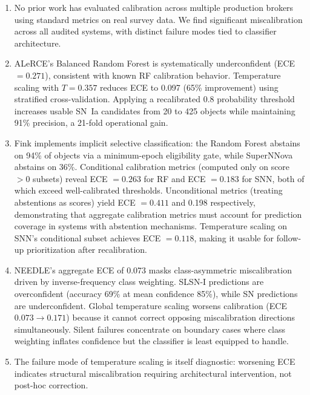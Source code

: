\documentclass[twocolumn]{aastex631}
\begin{document}
\begin{enumerate}
    \item No prior work has evaluated calibration across multiple production brokers using standard metrics on real survey data. We find significant miscalibration across all audited systems, with distinct failure modes tied to classifier architecture.

    \item ALeRCE's Balanced Random Forest is systematically underconfident (ECE $= 0.271$), consistent with known RF calibration behavior. Temperature scaling with $T = 0.357$ reduces ECE to 0.097 (65\% improvement) using stratified cross-validation. Applying a recalibrated 0.8 probability threshold increases usable SN~Ia candidates from 20 to 425 objects while maintaining 91\% precision, a 21-fold operational gain.

    \item Fink implements implicit selective classification: the Random Forest abstains on 94\% of objects via a minimum-epoch eligibility gate, while SuperNNova abstains on 36\%. Conditional calibration metrics (computed only on score $> 0$ subsets) reveal ECE $= 0.263$ for RF and ECE $= 0.183$ for SNN, both of which exceed well-calibrated thresholds. Unconditional metrics (treating abstentions as scores) yield ECE $= 0.411$ and 0.198 respectively, demonstrating that aggregate calibration metrics must account for prediction coverage in systems with abstention mechanisms. Temperature scaling on SNN's conditional subset achieves ECE $= 0.118$, making it usable for follow-up prioritization after recalibration.

    \item NEEDLE's aggregate ECE of 0.073 masks class-asymmetric miscalibration driven by inverse-frequency class weighting. SLSN-I predictions are overconfident (accuracy 69\% at mean confidence 85\%), while SN predictions are underconfident. Global temperature scaling worsens calibration (ECE $0.073 \to 0.171$) because it cannot correct opposing miscalibration directions simultaneously. Silent failures concentrate on boundary cases where class weighting inflates confidence but the classifier is least equipped to handle.

    \item The failure mode of temperature scaling is itself diagnostic: worsening ECE indicates structural miscalibration requiring architectural intervention, not post-hoc correction.
\end{enumerate}
\end{document}

